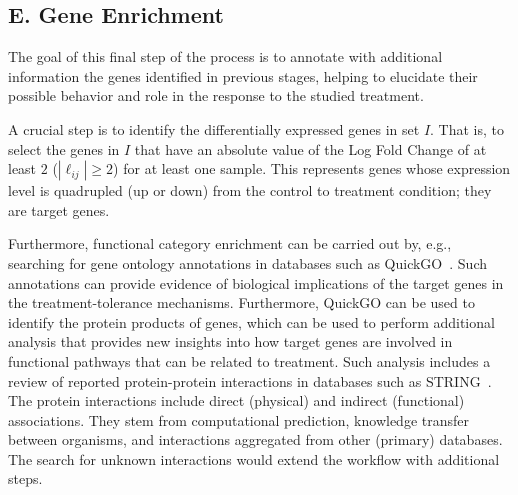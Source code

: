 \subsection*{E. Gene Enrichment}

The goal of this final step of the process is to annotate with
additional information the genes identified in previous stages,
helping to elucidate their possible behavior and role in the response
to the studied treatment.
\vspace{0.5cm}

A crucial step is to identify the differentially expressed genes in
set $I$. That is, to select the genes in $I$ that have an absolute
value of the Log Fold Change of at least $2$ ($|\ell_{ij}|\geq 2$) for
at least one sample. This represents genes whose expression level is
quadrupled (up or down) from the control to treatment condition; they are
target genes.
\vspace{0.5cm}

Furthermore, functional category enrichment can be carried out by, e.g., searching
for gene ontology annotations in databases such as
QuickGO~\cite{binns2009quickgo}. Such annotations can provide evidence
of biological implications of the target genes in the
treatment-tolerance mechanisms. Furthermore, QuickGO can be used to
identify the protein products of genes, which can be used to
perform additional analysis that provides new insights into how target genes are
involved in functional pathways that can be related to treatment.
Such analysis includes a review of reported
protein-protein interactions in databases such as
STRING~\cite{szklarczyk2016string}. The protein interactions include direct
(physical) and indirect (functional) associations. They stem from
computational prediction, knowledge transfer between organisms, and
interactions aggregated from other (primary) databases. The search for unknown interactions would extend the workflow with additional steps.
